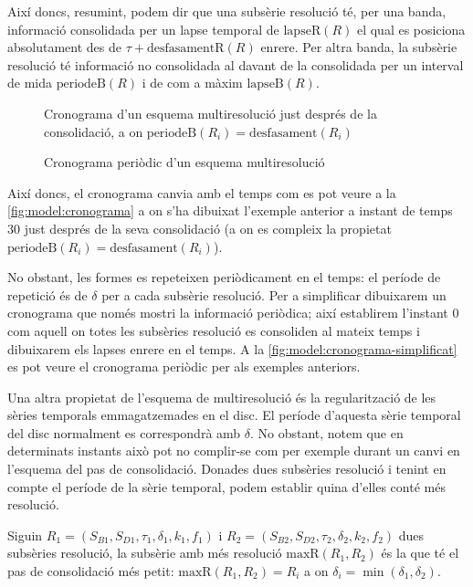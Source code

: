 Així doncs, resumint, podem dir que una subsèrie resolució té, per una
banda, informació consolidada per un lapse temporal de
$\text{lapseR}(R)$ el qual es posiciona absolutament des de $\tau +
\text{desfasamentR}(R)$ enrere. Per altra banda, la subsèrie resolució
té informació no consolidada al davant de la consolidada per un
interval de mida $\text{periodeB}(R)$ i de com a màxim
$\text{lapseB}(R)$.

\begin{figure}[tp]
  \centering
  
  \caption{Cronograma d'un esquema multiresolució just després de la consolidació, a on $\text{periodeB}(R_i)=\text{desfasament}(R_i)$}
  \label{fig:model:cronograma-consolidat}
\end{figure}


\begin{figure}[tp]
  \centering
  
  \caption{Cronograma periòdic d'un esquema multiresolució}
  \label{fig:model:cronograma-simplificat}
\end{figure}


\todo{}
Així doncs, el cronograma canvia amb el temps com es pot veure a la
\autoref{fig:model:cronograma} a on s'ha dibuixat l'exemple anterior a
instant de temps $30$ just després de la seva consolidació (a on es compleix la propietat$\text{periodeB}(R_i)=\text{desfasament}(R_i)$). 

No obstant, les formes es repeteixen periòdicament en el temps: el període de repetició és de $\delta$ per a cada subsèrie resolució. Per a simplificar dibuixarem un cronograma que només mostri la informació periòdica; així establirem l'instant 0 com aquell on totes les subsèries resolució es consoliden al mateix temps i dibuixarem els lapses enrere en el temps. A la \autoref{fig:model:cronograma-simplificat} es pot veure el cronograma periòdic per als exemples anteriors.
\todo{}





Una altra propietat de l'esquema de multiresolució és la
regularització de les sèries temporals emmagatzemades en el disc. El
període d'aquesta sèrie temporal del disc normalment es correspondrà
amb $\delta$. No obstant, notem que en determinats instants això pot
no complir-se com per exemple durant un canvi en l'esquema del pas de
consolidació. Donades dues subsèries resolució i tenint en compte el
període de la sèrie temporal, podem establir quina d'elles conté més
resolució.
\begin{definition}
  Siguin $R_1=(S_{B1},S_{D1},\tau_1,\delta_1,k_1,f_1)$ i
  $R_2=(S_{B2},S_{D2},\tau_2,\delta_2,k_2,f_2)$ dues subsèries
  resolució, la subsèrie amb més resolució $\text{maxR}(R_1,R_2)$ és
  la que té el pas de consolidació més petit: $\text{maxR}(R_1,R_2) =
  R_i$ a on $\delta_i = \min(\delta_1,\delta_2)$.
\end{definition}




